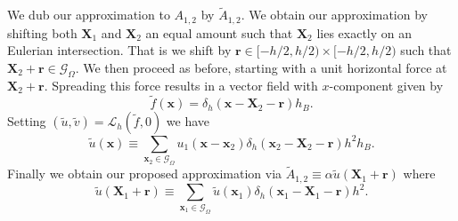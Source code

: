 \documentclass[preprint,12pt]{elsarticle}
\begin{document}
We dub our approximation to $A_{1,2}$ by $\tilde{A}_{1,2}$.
We obtain our approximation by shifting both $\mathbf{X}_1$ and $\mathbf{X}_2$ an equal amount such that $\mathbf{X}_2$ lies exactly on an Eulerian intersection. That is we shift by $\mathbf{r}\in[-h/2,h/2)\times[-h/2,h/2)$ such that $\mathbf{X}_2 +\mathbf{r}\in\mathcal{G}_\Omega$. We then proceed as before, starting with a unit horizontal force at $\mathbf{X}_2+\mathbf{r}$. Spreading this force results in a vector field with $x$-component given by
\begin{equation}
\tilde{f}(\mathbf{x}) = \delta_h(\mathbf{x} - \mathbf{X}_2 - \mathbf{r})h_B.
\end{equation}
Setting $(\tilde{u},\tilde{v})=\mathcal{L}_h(\tilde{f},0)$ we have
\begin{equation}
\tilde{u}(\mathbf{x}) \equiv
\sum_{\mathbf{x}_2\in\mathcal{G}_\Omega}
u_1(\mathbf{x} - \mathbf{x}_2)\delta_h(\mathbf{x}_2 - \mathbf{X}_2 - \mathbf{r})h^2h_B. \label{eq:utx}
\end{equation}
Finally we obtain our proposed approximation via $\tilde{A}_{1,2} \equiv \alpha \tilde{u}(\mathbf{X}_1+\mathbf{r})$ where
\begin{equation}
\tilde{u}(\mathbf{X}_1+\mathbf{r}) \equiv
\sum_{\mathbf{x}_1\in\mathcal{G}_\Omega}
\tilde{u}(\mathbf{x}_1)\delta_h(\mathbf{x}_1 - \mathbf{X}_1 - \mathbf{r})h^2. \label{eq:uts}
\end{equation}
\end{document}
